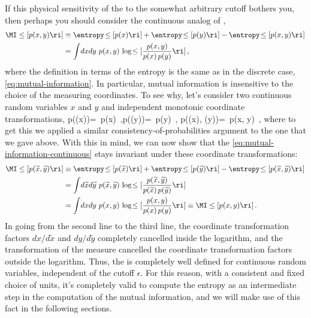 If this physical sensitivity of the  to the somewhat arbitrary cutoff bothers you, then perhaps you should consider the continuous analog of ,  
\begin{align}\label{eq:mutual-information-continuous}
\MI\le[p(x,y)\ri] &\equiv \entropy\!\le[p(x)\ri] +\entropy\!\le[p(y)\ri]-\entropy\!\le[p(x,y)\ri]\, \\
&= \int \! dx dy \ p(x,y) \, \log \!\le[ \frac{p(x,y)}{p(x)\, p(y)} \ri] \, , \notag
\end{align}
where the definition in terms of the entropy is the same as in the discrete case, \eqref{eq:mutual-information}.
In particular,  mutual information is insensitive to the choice of the measuring coordinates. To see why, let's consider  two continuous random variables $x$ and $y$ and independent monotonic coordinate transformations,
\be\label{eq:MI-invariant-transformations}
p\Big((x)\Big)=\ p(x)\, ,\qquad p\Big((y)\Big)=\ p(y)\, , \qquad p\Big((x), (y)\Big)=\ p(x, y)\, ,
\ee
where to get this we applied a similar consistency-of-probabilities argument to the one that we gave above.
With this in mind, we can now show that the  \eqref{eq:mutual-information-continuous}  stays invariant under these coordinate transformations:
\begin{align}\label{eq:mutual-information-invariant}
\MI\le[p(\widetilde{x}, \widetilde{y})\ri] &\equiv \entropy\!\le[p(\widetilde{x})\ri] +\entropy\!\le[p(\widetilde{y})\ri]-\entropy\!\le[p(\widetilde{x},\widetilde{y})\ri]\, \\
&= \int \! d\widetilde{x} d\widetilde{y} \ p(\widetilde{x},\widetilde{y}) \,\log\!\le[ \frac{p(\widetilde{x},\widetilde{y})}{p(\widetilde{x})\, p(\widetilde{y})} \ri] \, \notag\\
&=\int\!  dx dy\ p(x,y) \,\log\!\le[ \frac{p(x,y)}{p(x)\, p(y)} \ri]\equiv\MI\le[p(x,y)\ri]\, .\notag
\end{align}
In going from the second line to the third line, the coordinate transformation factors $ dx / d\widetilde{x}$ and $dy/d\widetilde{y}$ completely cancelled inside the logarithm, and the transformation of the measure cancelled the coordinate transformation  factors outside the logarithm.
Thus, the  is completely well defined for continuous random variables, independent of the cutoff $\epsilon$. For this reason, with a consistent and fixed choice of units, it's completely valid to compute the entropy as an intermediate step in the computation of the mutual information, and we will make use of this fact in the following sections.



